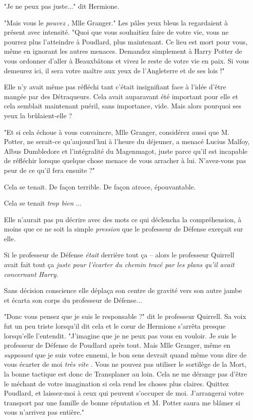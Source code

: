 "Je ne peux pas juste..." dit Hermione.

"Mais vous le \emph{pouvez} , Mlle Granger." Les pâles yeux bleus la regardaient à présent avec intensité. "Quoi que vous souhaitiez faire de votre vie, vous ne pourrez plus l'atteindre à Poudlard, plus maintenant. Ce lieu est mort pour vous, même en ignorant les autres menaces. Demandez simplement à Harry Potter de vous ordonner d'aller à Beauxbâtons et vivez le reste de votre vie en paix. Si vous demeurez ici, il sera votre maître aux yeux de l'Angleterre et de ses lois !"

Elle n'y avait même pas réfléchi tant c'était insignifiant face à l'idée d'être mangée par des Détraqueurs. Cela avait auparavant été important pour elle et cela semblait maintenant puéril, sans importance, vide. Mais alors pourquoi ses yeux la brûlaient-elle ?

"Et si cela échoue à vous convaincre, Mlle Granger, considérez aussi que M. Potter, ne serait-ce qu'aujourd'hui à l'heure du déjeuner, a menacé Lucius Malfoy, Albus Dumbledore et l'intégralité du Magenmagot, juste parce qu'il est incapable de réfléchir lorsque quelque chose menace de vous arracher à lui. N'avez-vous pas peur de ce qu'il fera ensuite ?"

Cela se tenait. De façon terrible. De façon atroce, épouvantable.

Cela se tenait \emph{trop bien} ...

Elle n'aurait pas pu décrire avec des mots ce qui déclencha la compréhension, à moins que ce ne soit la simple \emph{pression}  que le professeur de Défense exerçait sur elle.

Si le professeur de Défense \emph{était}  derrière tout ça – alors le professeur Quirrell avait fait tout ça \emph{juste pour l'écarter du chemin tracé par les plans qu'il avait concernant Harry.} 

Sans décision conscience elle déplaça son centre de gravité vers son autre jambe et écarta son corps du professeur de Défense...

"Donc vous pensez que je suis le responsable ?" dit le professeur Quirrell. Sa voix fut un peu triste lorsqu'il dit cela et le cœur de Hermione s'arrêta presque lorsqu'elle l'entendit. "J'imagine que je ne peux pas vous en vouloir. Je suis le professeur de Défense de Poudlard après tout. Mais Mlle Granger, même en \emph{supposant}  que je suis votre ennemi, le bon sens devrait quand même vous dire de vous écarter de moi \emph{très vite} . Vous ne pouvez pas utiliser le sortilège de la Mort, la bonne tactique est donc de Transplaner au loin. Cela ne me dérange pas d'être le méchant de votre imagination si cela rend les choses plus claires. Quittez Poudlard, et laissez-moi à ceux qui peuvent s'occuper de moi. J'arrangerai votre transport par une famille de bonne réputation et M. Potter saura me blâmer si vous n'arrivez pas entière."

